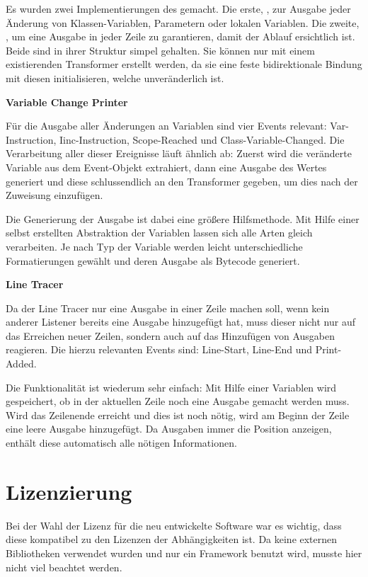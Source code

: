 Es wurden zwei Implementierungen des  gemacht. Die erste, , zur Ausgabe jeder Änderung von Klassen-Variablen, Parametern oder lokalen Variablen. Die zweite, , um eine Ausgabe in jeder Zeile zu garantieren, damit der Ablauf ersichtlich ist. Beide sind in ihrer Struktur simpel gehalten. Sie können nur mit einem existierenden Transformer erstellt werden, da sie eine feste bidirektionale Bindung mit diesen initialisieren, welche unveränderlich ist.

\textbf{Variable Change Printer}

Für die Ausgabe aller Änderungen an Variablen sind vier Events relevant: Var-Instruction, Iinc-Instruction, Scope-Reached und Class-Variable-Changed. Die Verarbeitung aller dieser Ereignisse läuft ähnlich ab: Zuerst wird die veränderte Variable aus dem Event-Objekt extrahiert, dann eine Ausgabe des Wertes generiert und diese schlussendlich an den Transformer gegeben, um dies nach der Zuweisung einzufügen.

Die Generierung der Ausgabe ist dabei eine größere Hilfsmethode. Mit Hilfe einer selbst erstellten Abstraktion der Variablen lassen sich alle Arten gleich verarbeiten. Je nach Typ der Variable werden leicht unterschiedliche Formatierungen gewählt und deren Ausgabe als Bytecode generiert.

\textbf{Line Tracer}

Da der Line Tracer nur eine Ausgabe in einer Zeile machen soll, wenn kein anderer Listener bereits eine Ausgabe hinzugefügt hat, muss dieser nicht nur auf das Erreichen neuer Zeilen, sondern auch auf das Hinzufügen von Ausgaben reagieren. Die hierzu relevanten Events sind: Line-Start, Line-End und Print-Added.

Die Funktionalität ist wiederum sehr einfach: Mit Hilfe einer Variablen wird gespeichert, ob in der aktuellen Zeile noch eine Ausgabe gemacht werden muss. Wird das Zeilenende erreicht und dies ist noch nötig, wird am Beginn der Zeile eine leere Ausgabe hinzugefügt. Da Ausgaben immer die Position anzeigen, enthält diese automatisch alle nötigen Informationen.

\section{Lizenzierung} 

Bei der Wahl der Lizenz für die neu entwickelte Software war es wichtig, dass diese kompatibel zu den Lizenzen der Abhängigkeiten ist. Da keine externen Bibliotheken verwendet wurden und nur ein Framework benutzt wird, musste hier nicht viel beachtet werden.

